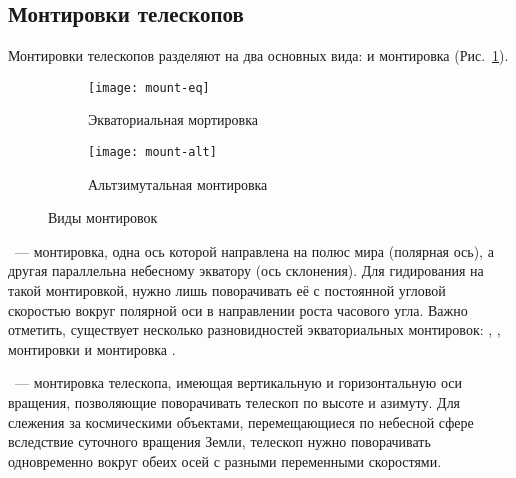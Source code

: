 \subsection{Монтировки телескопов}
Монтировки телескопов разделяют на два основных вида:  и  монтировка (Рис.~\ref{mounts}).
\begin{figure}[h]
	\centering
	\hspace*{.4cm}
	\begin{subfigure}{0.48\textwidth}
		\texttt{[image: mount-eq]}
		\caption{Экваториальная мортировка}
	 \end{subfigure}
	\hspace*{.4cm}
	\begin{subfigure}{0.41\textwidth}
		\texttt{[image: mount-alt]}
		\caption{Альтзимутальная монтировка}
	 \end{subfigure}
	 \hspace*{.4cm}
	 \caption{Виды монтировок}
	 \label{mounts}
\end{figure}

~--- монтировка, одна ось которой направлена на полюс мира (полярная ось), а другая параллельна небесному экватору (ось склонения). Для гидирования на такой монтировкой, нужно лишь поворачивать её с постоянной угловой скоростью вокруг полярной оси в направлении роста часового угла. Важно отметить, существует несколько разновидностей экваториальных монтировок: , ,  монтировки и монтировка .

~--- монтировка телескопа, имеющая вертикальную и горизонтальную оси вращения, позволяющие поворачивать телескоп по высоте и азимуту. Для слежения за космическими объектами, перемещающиеся по небесной сфере вследствие суточного вращения Земли, телескоп нужно поворачивать одновременно вокруг обеих осей с разными переменными скоростями.